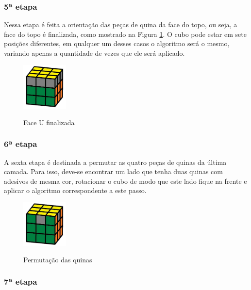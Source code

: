 \subsubsection{5ª etapa}

Nessa etapa é feita a orientação das peças de quina da face do topo, ou seja, a face do topo é finalizada, como mostrado na Figura \ref{fig:figpasso5}. O cubo pode estar em sete posições diferentes, em qualquer um desses casos o algoritmo será o mesmo, variando apenas a quantidade de vezes que ele será aplicado.

\begin{figure}[!htb]
    \centering
    {
        \includegraphics[height=2.4cm]{imagens/passo5.jpg}
        \label{figFront}
    }
    
\caption{Face U finalizada}
\label{fig:figpasso5}
\end{figure}

\subsubsection{6ª etapa}

A sexta etapa é destinada a permutar as quatro peças de quinas da última camada. Para isso, deve-se encontrar um lado que tenha duas quinas com adesivos de mesma cor, rotacionar o cubo de modo que este lado fique na frente e aplicar o algoritmo correspondente a este passo.

\begin{figure}[!htb]
    \centering
    {
        \includegraphics[height=2.4cm]{imagens/passo6.jpg}
        \label{figFront}
    }
    
\caption{Permutação das quinas}
\label{fig:figpasso6}
\end{figure}

\subsubsection{7ª etapa}

